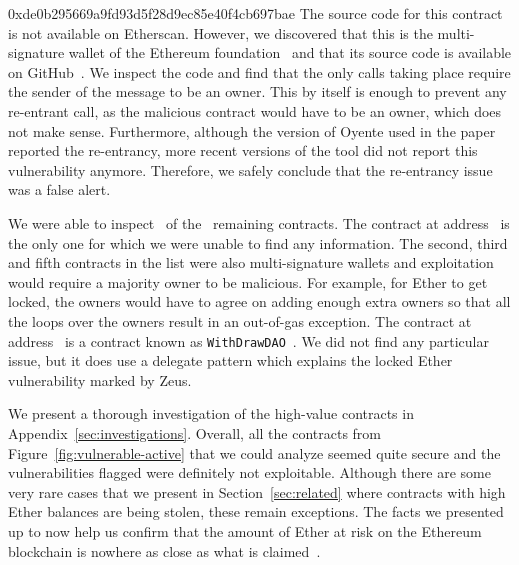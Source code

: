 \begin{investigation}{0xde0b295669a9fd93d5f28d9ec85e40f4cb697bae}
The source code for this contract is not available on Etherscan. However, we discovered that this is the multi-signature wallet of the Ethereum foundation~\cite{ether-foundation-contract-reddit} and that its source code is available on GitHub~\cite{ether-foundation-contract-code}. We inspect the code and find that the only calls taking place require the sender of the message to be an owner. This by itself is enough to prevent any re-entrant call, as the malicious contract would have to be an owner, which does not make sense. Furthermore, although the version of Oyente used in the paper reported the re-entrancy, more recent versions of the tool did not report this vulnerability anymore. Therefore, we safely conclude that the re-entrancy issue was a false alert.
\end{investigation}

We were able to inspect~ of the~ remaining contracts. The contract at address~ is the only one for which we were unable to find any information. The second, third and fifth contracts in the list were also multi-signature wallets and exploitation would require a majority owner to be malicious. For example, for Ether to get locked, the owners would have to agree on adding enough extra owners so that all the loops over the owners result in an out-of-gas exception. The contract at address~ is a contract known as \lstinline{WithDrawDAO}~\cite{withdraw-dao}. We did not find any particular issue, but it does use a delegate pattern which explains the locked Ether vulnerability marked by Zeus.

We present a thorough investigation of the high-value contracts in Appendix~\ref{sec:investigations}. Overall, all the contracts from Figure~\ref{fig:vulnerable-active} that we could analyze seemed quite secure and the vulnerabilities flagged were definitely not exploitable. Although there are some very rare cases that we present in Section~\ref{sec:related} where contracts with high Ether balances are being stolen, these remain exceptions. The facts we presented up to now help us confirm that the amount of Ether at risk on the Ethereum blockchain is nowhere as close as what is claimed~\cite{DBLP:conf/ndss/KalraGDS18,Grech2018}.


